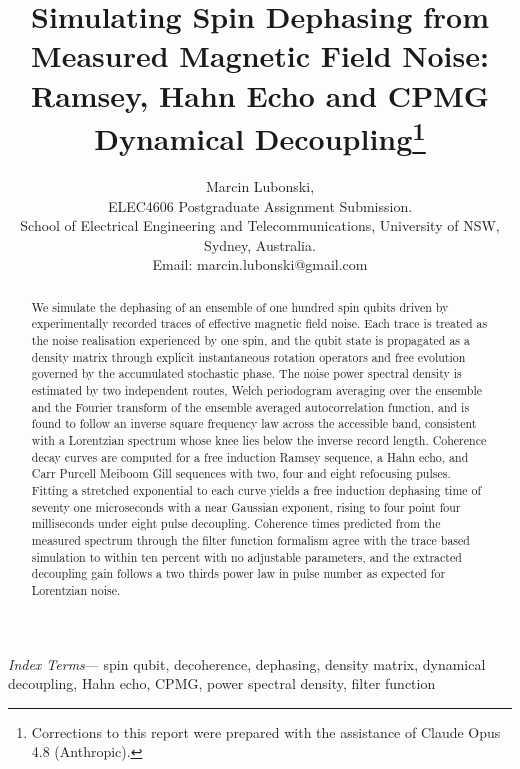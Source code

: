 \documentclass[10pt,twocolumn,a4paper]{article}
\newenvironment{IEEEkeywords}%
  {\vspace{2pt}\par\noindent\small\textit{Index Terms}---}{\par}
\begin{document}
\title{\vspace{-2em}Simulating Spin Dephasing from Measured Magnetic Field Noise:\\
Ramsey, Hahn Echo and CPMG Dynamical Decoupling\thanks{Corrections to this report were prepared with the assistance of
Claude Opus 4.8 (Anthropic).}}
\author{Marcin Lubonski, \\
ELEC4606 Postgraduate Assignment Submission. \\ 
School of Electrical Engineering and Telecommunications, University of NSW, Sydney, Australia. \\
Email: marcin.lubonski@gmail.com}
\date{}
\maketitle

\begin{abstract}
We simulate the dephasing of an ensemble of one hundred spin qubits driven by
experimentally recorded traces of effective magnetic field noise. Each trace is
treated as the noise realisation experienced by one spin, and the qubit state is
propagated as a density matrix through explicit instantaneous rotation operators
and free evolution governed by the accumulated stochastic phase. The noise power
spectral density is estimated by two independent routes, Welch periodogram
averaging over the ensemble and the Fourier transform of the ensemble averaged
autocorrelation function, and is found to follow an inverse square frequency law
across the accessible band, consistent with a Lorentzian spectrum whose knee lies
below the inverse record length. Coherence decay curves are computed for a free
induction Ramsey sequence, a Hahn echo, and Carr Purcell Meiboom Gill sequences
with two, four and eight refocusing pulses. Fitting a stretched exponential to
each curve yields a free induction dephasing time of seventy one microseconds
with a near Gaussian exponent, rising to four point four milliseconds under eight
pulse decoupling. Coherence times predicted from the measured spectrum through
the filter function formalism agree with the trace based simulation to within ten
percent with no adjustable parameters, and the extracted decoupling gain follows a
two thirds power law in pulse number as expected for Lorentzian noise.
\end{abstract}

\begin{IEEEkeywords}
spin qubit, decoherence, dephasing, density matrix, dynamical decoupling, Hahn
echo, CPMG, power spectral density, filter function
\end{IEEEkeywords}
\end{document}
